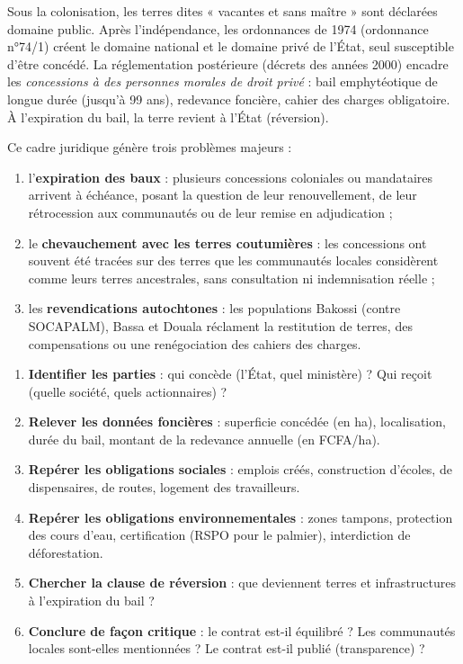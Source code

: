 \documentclass[11pt]{article}
\newcommand{\cle}[1]{{\popxbold\color{popdark}#1}}
\begin{document}
\begin{propriete}
Sous la colonisation, les terres dites « vacantes et sans maître » sont déclarées \cle{domaine public}. Après l'indépendance, les ordonnances de 1974 (ordonnance n°74/1) créent le \cle{domaine national} et le domaine privé de l'État, seul susceptible d'être concédé. La réglementation postérieure (décrets des années 2000) encadre les \emph{concessions à des personnes morales de droit privé} : bail emphytéotique de longue durée (jusqu'à 99 ans), redevance foncière, cahier des charges obligatoire. À l'expiration du bail, la terre revient à l'État (réversion).
\end{propriete}

Ce cadre juridique génère trois problèmes majeurs :
\begin{enumerate}
\item l'\textbf{expiration des baux} : plusieurs concessions coloniales ou mandataires arrivent à échéance, posant la question de leur renouvellement, de leur rétrocession aux communautés ou de leur remise en adjudication ;
\item le \textbf{chevauchement avec les terres coutumières} : les concessions ont souvent été tracées sur des terres que les communautés locales considèrent comme leurs terres ancestrales, sans consultation ni indemnisation réelle ;
\item les \textbf{revendications autochtones} : les populations Bakossi (contre SOCAPALM), Bassa et Douala réclament la restitution de terres, des compensations ou une renégociation des cahiers des charges.
\end{enumerate}

\begin{methode}
\begin{enumerate}
\item \textbf{Identifier les parties} : qui concède (l'État, quel ministère) ? Qui reçoit (quelle société, quels actionnaires) ?
\item \textbf{Relever les données foncières} : superficie concédée (en ha), localisation, durée du bail, montant de la redevance annuelle (en FCFA/ha).
\item \textbf{Repérer les obligations sociales} : emplois créés, construction d'écoles, de dispensaires, de routes, logement des travailleurs.
\item \textbf{Repérer les obligations environnementales} : zones tampons, protection des cours d'eau, certification (RSPO pour le palmier), interdiction de déforestation.
\item \textbf{Chercher la clause de réversion} : que deviennent terres et infrastructures à l'expiration du bail ?
\item \textbf{Conclure de façon critique} : le contrat est-il équilibré ? Les communautés locales sont-elles mentionnées ? Le contrat est-il publié (transparence) ?
\end{enumerate}
\end{methode}
\end{document}
